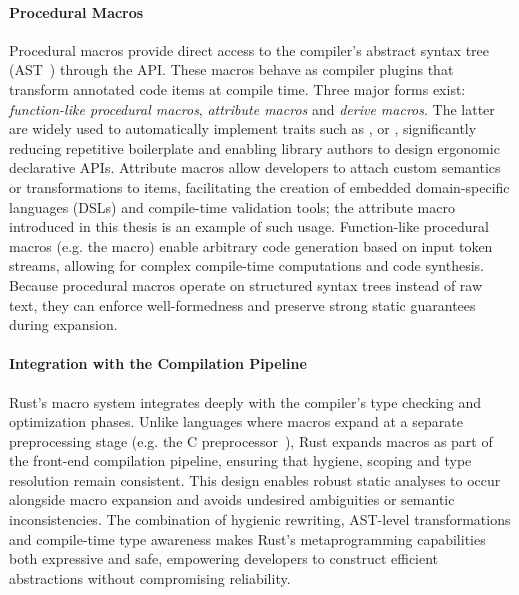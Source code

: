 \paragraph{Procedural Macros}
Procedural macros provide direct access to the compiler's abstract syntax tree (AST~\cite{Aho06,Baxter98}) through the  API.
These macros behave as compiler plugins that transform annotated code items at compile time.
Three major forms exist: \textit{function-like procedural macros}, \textit{attribute macros} and \textit{derive macros}.
The latter are widely used to automatically implement traits such as ,  or , significantly reducing repetitive boilerplate and enabling library authors to design ergonomic declarative APIs.
Attribute macros allow developers to attach custom semantics or transformations to items, facilitating the creation of embedded domain-specific languages (DSLs) and compile-time validation tools; the \inlinerust{#[when(...)]} attribute macro introduced in this thesis is an example of such usage.
Function-like procedural macros (e.g. the  macro) enable arbitrary code generation based on input token streams, allowing for complex compile-time computations and code synthesis.
Because procedural macros operate on structured syntax trees instead of raw text, they can enforce well-formedness and preserve strong static guarantees during expansion.

\paragraph{Integration with the Compilation Pipeline}
Rust's macro system integrates deeply with the compiler's type checking and optimization phases.
Unlike languages where macros expand at a separate preprocessing stage (e.g. the C preprocessor~\cite{Dietrich2021CppSigET}), Rust expands macros as part of the front-end compilation pipeline, ensuring that hygiene, scoping and type resolution remain consistent.
This design enables robust static analyses to occur alongside macro expansion and avoids undesired ambiguities or semantic inconsistencies.
The combination of hygienic rewriting, AST-level transformations and compile-time type awareness makes Rust's metaprogramming capabilities both expressive and safe, empowering developers to construct efficient abstractions without compromising reliability.
